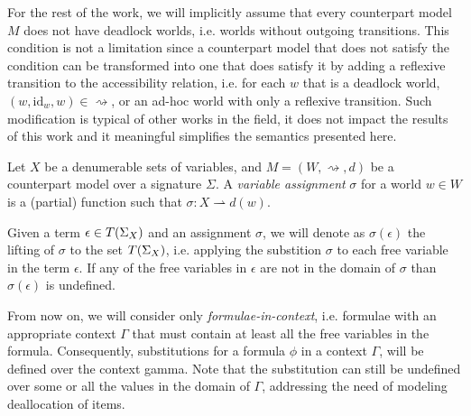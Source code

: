 For the rest of the work, we will implicitly assume that every counterpart model $M$ does not have deadlock worlds, i.e.
worlds without outgoing transitions. This condition is not a limitation since a counterpart model that does not satisfy
the condition can be transformed into one that does satisfy it by adding a reflexive transition to the accessibility
relation, i.e. for each $w$ that is a deadlock world, $(w, \text{id}_w, w) \in \rightsquigarrow$, or an ad-hoc world
with only a reflexive transition. Such modification is typical of other works in the field, it does not impact the
results of this work and it meaningful simplifies the semantics presented here.

\begin{definition}
  Let $X$ be a denumerable sets of variables, and $M = (W, \rightsquigarrow, d)$ be a counterpart model over a signature
  $\Sigma$. A \emph{variable assignment} $\sigma$ for a world $w \in W$ is a (partial) function such that $\sigma : X
  \rightharpoonup d(w)$.
\end{definition}

Given a term $\epsilon \in T({\Sigma}_{X})$ and an assignment $\sigma$, we will denote as
$\sigma(\epsilon)$ the lifting of $\sigma$ to the set $T({\Sigma}_{X})$, i.e. applying the substition $\sigma$ to each
free variable in the term $\epsilon$. If any of the free variables in $\epsilon$ are not in the domain of $\sigma$ than $\sigma(\epsilon)$ is undefined.

From now on, we will consider only \emph{formulae-in-context}, i.e. formulae with an appropriate context $\Gamma$ that
must contain at least all the free variables in the formula. Consequently, substitutions for a formula $\phi$ in a
context $\Gamma$, will be defined over the context gamma. Note that the substitution can still be undefined over some
or all the values in the domain of $\Gamma$, addressing the need of modeling deallocation of items.
